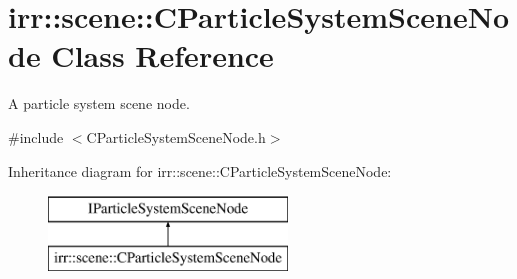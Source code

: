\hypertarget{classirr_1_1scene_1_1_c_particle_system_scene_node}{\section{irr\-:\-:scene\-:\-:C\-Particle\-System\-Scene\-Node Class Reference}
\label{classirr_1_1scene_1_1_c_particle_system_scene_node}
}


A particle system scene node.  




{\ttfamily \#include $<$C\-Particle\-System\-Scene\-Node.\-h$>$}

Inheritance diagram for irr\-:\-:scene\-:\-:C\-Particle\-System\-Scene\-Node\-:\begin{figure}[H]
\begin{center}
\leavevmode
\includegraphics[height=2.000000cm]{classirr_1_1scene_1_1_c_particle_system_scene_node}
\end{center}
\end{figure}
